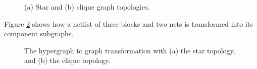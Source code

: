 \begin{figure}[!htbp]
\centering
{}
\caption{(a) Star and (b) clique graph topologies.}
\label{fig:star_clique}
\end{figure}



Figure \ref{fig:hyperedge_to_graph} shows how a netlist of three blocks and two nets is transformed into its component subgraphs.

\begin{figure}[!htbp]
\centering
{}
\caption{The hypergraph to graph transformation with (a) the star topology, and (b) the clique topology.}
\label{fig:hyperedge_to_graph}
\end{figure}

